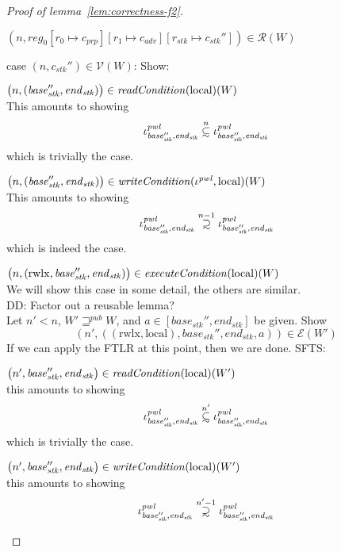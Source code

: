 \documentclass[a4paper]{article}
\newcommand{\update}[2]{[#1 \mapsto #2]}
\newcommand\subsetsim{\mathrel{\ooalign{\raise.2ex\hbox{$\subset$}\cr
      \hidewidth\lower.8ex\hbox{\scalebox{0.9}{$\sim$}}\hidewidth\cr}}}
\newcommand\supsetsim{\mathrel{\ooalign{\raise.2ex\hbox{$\supset$}\cr
      \hidewidth\lower.8ex\hbox{\scalebox{0.9}{$\sim$}}\hidewidth\cr}}}
\newcommand{\nsubsim}[1][n]{\stackrel{\tiny{#1}}{\subsetsim}}
\newcommand{\nsupsim}[1][n]{\stackrel{\tiny{#1}}{\supsetsim}}
\newcommand\dominique[1]{{\color{purple} \sf \footnotesize {DD: #1}}\\}
\newcommand{\var}[1]{\mathit{#1}}
\newcommand{\start}{\var{base}}
\newcommand{\addrend}{\var{end}}
\newcommand{\reg}{\var{reg}}
\newcommand{\adv}{\var{adv}}
\newcommand{\stk}{\var{stk}}
\newcommand{\pwl}{\var{pwl}}
\newcommand{\plainfun}[2]{
  \ifthenelse{\equal{#2}{}}
  {\mathit{#1}}
  {\mathit{#1}(#2)}
}
\newcommand{\readCond}[1]{\plainfun{readCondition}{#1}}
\newcommand{\writeCond}[1]{\plainfun{writeCondition}{#1}}
\newcommand{\execCond}[1]{\plainfun{executeCondition}{#1}}
\newcommand{\futurewk}{\mathbin{\sqsupseteq}^{\var{pub}}}
\newcommand{\asmType}{\plaindom{AsmType}}
\newcommand{\plaindom}[1]{\mathrm{#1}}
\newcommand{\intr}[2]{\mathcal{#1}}
\newcommand{\valueintr}[1]{\intr{V}{#1}}
\newcommand{\exprintr}[1]{\intr{E}{#1}}
\newcommand{\regintr}[1]{\intr{R}{#1}}
\newcommand{\stdvr}{\valueintr{\asmType}}
\newcommand{\stder}{\exprintr{\asmType}}
\newcommand{\stdrr}{\regintr{\asmType}}
\newcommand{\npair}[2][n]{\left(#1,#2 \right)}
\newcommand{\plainperm}[1]{\mathrm{#1}}
\newcommand{\rwlx}{\plainperm{rwlx}}
\newcommand{\local}{\plainperm{local}}
\begin{document}
\begin{proof}[Proof of lemma~\ref{lem:correctness-f2}]
\begin{enumproof}[resume]
\begin{itemize}
\begin{itemize}
      \end{itemize}
    \end{itemize}
  \item $\npair{\reg_0\update{r_0}{c_{\var{prp}}}\update{r_1}{c_\adv}\update{r_\stk}{c_\stk''}} \in \stdrr(W)$ \label{lem:f2-reg-rel}
    \begin{enumproof}
    \item case $\npair{c_\stk''} \in \stdvr(W)$: Show: \label{f2:stack-in-vr}
      \begin{enumproof}
      \item $\npair{(\start_\stk'', \addrend_\stk)} \in \readCond{}(\local)(W)$ \\
        This amounts to showing 
        \[
          \iota^\pwl_{\start_\stk'', \addrend_\stk} \nsubsim[n] \iota^\pwl_{\start_\stk'', \addrend_\stk}
        \]
        which is trivially the case.
      \item $\npair{(\start_\stk'', \addrend_\stk)} \in \writeCond{}(\iota^\pwl,\local)(W)$\\
        This amounts to showing 
        \[
          \iota^\pwl_{\start_\stk'', \addrend_\stk} \nsupsim[n-1] \iota^\pwl_{\start_\stk'', \addrend_\stk}
        \]
        which is indeed the case.
      \item $\npair{(\rwlx,\start_\stk'', \addrend_\stk)} \in \execCond{}(\local)(W)$ \label{f2:rwlx-exec-case} \\
        We will show this case in some detail, the others are similar. \\
        \dominique{Factor out a reusable lemma?}
        Let $n' < n$, $W' \futurewk W$, and $a \in [\start_\stk'', \addrend_\stk]$ be given. Show
        \[
          \npair[n']{((\rwlx,\local),\start_\stk'', \addrend_\stk,a)} \in \stder(W')
        \]
        If we can apply the FTLR at this point, then we are done. SFTS:
        \begin{enumproof}
        \item $\npair[n']{\start_\stk'', \addrend_\stk} \in \readCond{}(\local)(W')$\\
          this amounts to showing
          \[
            \iota^\pwl_{\start_\stk'', \addrend_\stk} \nsubsim[n'] \iota^\pwl_{\start_\stk'', \addrend_\stk}
          \]
          which is trivially the case.
        \item $\npair[n']{\start_\stk'', \addrend_\stk} \in \writeCond{}(\local)(W')$ \\
          this amounts to showing
          \[
            \iota^\pwl_{\start_\stk'', \addrend_\stk} \nsupsim[n'-1] \iota^\pwl_{\start_\stk'', \addrend_\stk}
\]
\end{enumproof}
\end{enumproof}
\end{enumproof}
\end{enumproof}
\end{proof}
\end{document}
